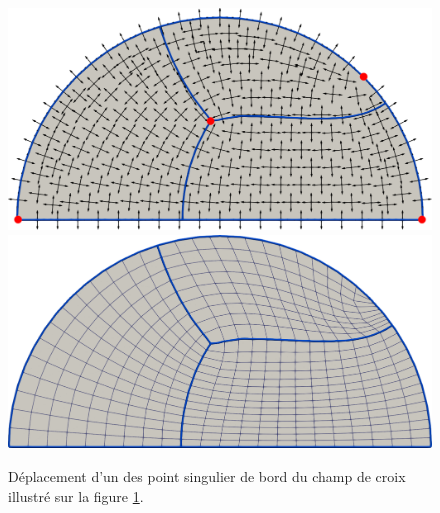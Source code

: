 \begin{figure}[!h]
\centering
\includegraphics[scale=0.24]{images/yo_11.pdf}\\[0.5cm]
\includegraphics[scale=0.24]{images/yo_12.pdf}
\caption{Déplacement d'un des point singulier de bord du champ de croix illustré sur la figure \ref{fig:demiDisc_sing_bord_second}.}
\label{fig:demiDisc_sing_bord_second}
\end{figure}

